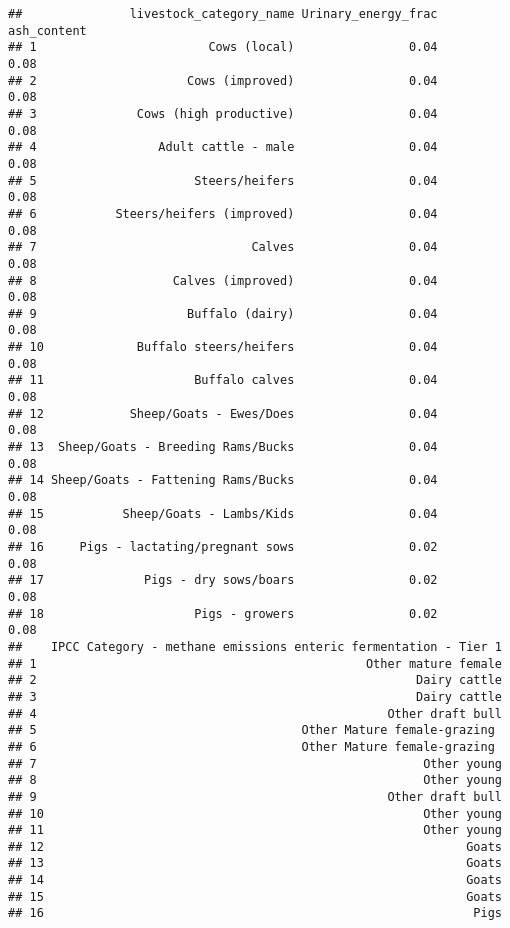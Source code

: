 \documentclass[
]{article}
\begin{document}
\begin{verbatim}
##               livestock_category_name Urinary_energy_frac ash_content
## 1                        Cows (local)                0.04        0.08
## 2                     Cows (improved)                0.04        0.08
## 3              Cows (high productive)                0.04        0.08
## 4                 Adult cattle - male                0.04        0.08
## 5                      Steers/heifers                0.04        0.08
## 6           Steers/heifers (improved)                0.04        0.08
## 7                              Calves                0.04        0.08
## 8                   Calves (improved)                0.04        0.08
## 9                     Buffalo (dairy)                0.04        0.08
## 10             Buffalo steers/heifers                0.04        0.08
## 11                     Buffalo calves                0.04        0.08
## 12            Sheep/Goats - Ewes/Does                0.04        0.08
## 13  Sheep/Goats - Breeding Rams/Bucks                0.04        0.08
## 14 Sheep/Goats - Fattening Rams/Bucks                0.04        0.08
## 15           Sheep/Goats - Lambs/Kids                0.04        0.08
## 16     Pigs - lactating/pregnant sows                0.02        0.08
## 17              Pigs - dry sows/boars                0.02        0.08
## 18                     Pigs - growers                0.02        0.08
##    IPCC Category - methane emissions enteric fermentation - Tier 1
## 1                                              Other mature female
## 2                                                     Dairy cattle
## 3                                                     Dairy cattle
## 4                                                 Other draft bull
## 5                                     Other Mature female-grazing 
## 6                                     Other Mature female-grazing 
## 7                                                      Other young
## 8                                                      Other young
## 9                                                 Other draft bull
## 10                                                     Other young
## 11                                                     Other young
## 12                                                           Goats
## 13                                                           Goats
## 14                                                           Goats
## 15                                                           Goats
## 16                                                            Pigs

\end{verbatim}
\end{document}
